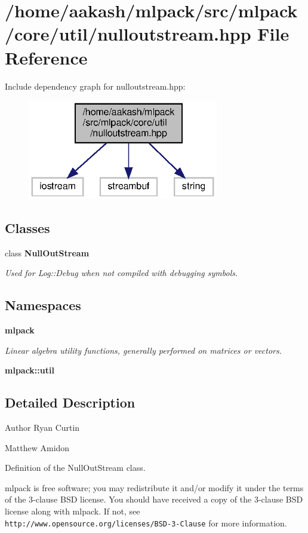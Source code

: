 \section{/home/aakash/mlpack/src/mlpack/core/util/nulloutstream.hpp File Reference}
\label{nulloutstream_8hpp}
Include dependency graph for nulloutstream.\+hpp\+:
\nopagebreak
\begin{figure}[H]
\begin{center}
\leavevmode
\includegraphics[width=236pt]{nulloutstream_8hpp__incl}
\end{center}
\end{figure}
\subsection*{Classes}
\begin{DoxyCompactItemize}
\item 
class \textbf{ Null\+Out\+Stream}
\begin{DoxyCompactList}\small\item\em Used for Log\+::\+Debug when not compiled with debugging symbols. \end{DoxyCompactList}\end{DoxyCompactItemize}
\subsection*{Namespaces}
\begin{DoxyCompactItemize}
\item 
 \textbf{ mlpack}
\begin{DoxyCompactList}\small\item\em Linear algebra utility functions, generally performed on matrices or vectors. \end{DoxyCompactList}\item 
 \textbf{ mlpack\+::util}
\end{DoxyCompactItemize}


\subsection{Detailed Description}
\begin{DoxyAuthor}{Author}
Ryan Curtin 

Matthew Amidon
\end{DoxyAuthor}
Definition of the Null\+Out\+Stream class.

mlpack is free software; you may redistribute it and/or modify it under the terms of the 3-\/clause B\+SD license. You should have received a copy of the 3-\/clause B\+SD license along with mlpack. If not, see {\tt http\+://www.\+opensource.\+org/licenses/\+B\+S\+D-\/3-\/\+Clause} for more information. 